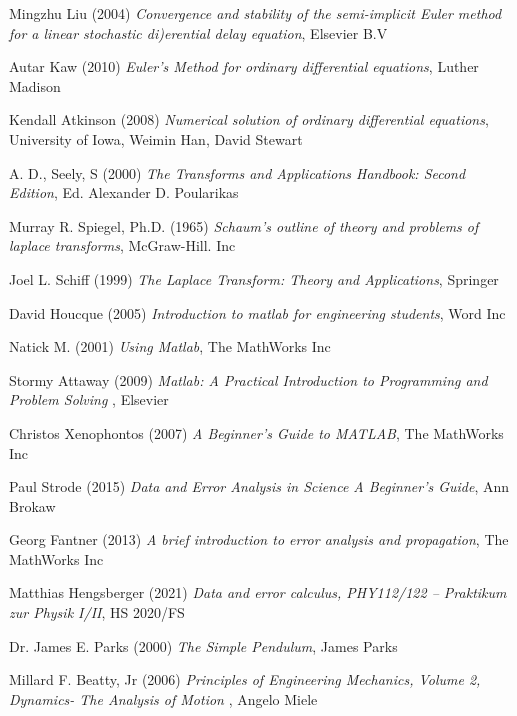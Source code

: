 \documentclass[12pt, a4paper]{article}
\begin{document}
\begin{thebibliography}{15}
Mingzhu Liu (2004) \emph{Convergence and stability of the semi-implicit Euler method
for a linear stochastic di)erential delay equation}, Elsevier B.V

Autar Kaw (2010) \emph{Euler’s Method for ordinary differential equations}, Luther Madison

Kendall Atkinson (2008) \emph{Numerical solution of ordinary differential equations}, University of Iowa, Weimin Han, David Stewart

A. D., Seely, S (2000) \emph{The Transforms and Applications Handbook: Second Edition}, Ed. Alexander D. Poularikas

Murray R. Spiegel, Ph.D. (1965) \emph{Schaum's outline of theory and problems of laplace transforms}, McGraw-Hill. Inc

Joel L. Schiff (1999) \emph{The Laplace Transform: Theory and Applications}, Springer

David Houcque (2005) \emph{Introduction to matlab for engineering students}, Word Inc 

Natick M. (2001) \emph{Using Matlab}, The MathWorks Inc

Stormy Attaway (2009) \emph{Matlab: A Practical Introduction to Programming and Problem Solving
}, Elsevier

Christos Xenophontos (2007) \emph{A Beginner’s Guide to MATLAB}, The MathWorks Inc

Paul Strode (2015) \emph{Data and Error Analysis in Science A Beginner’s Guide}, Ann Brokaw

Georg Fantner (2013) \emph{A brief introduction to error analysis and propagation}, The MathWorks Inc

Matthias Hengsberger (2021) \emph{Data and error calculus, PHY112/122 – Praktikum zur Physik I/II}, HS 2020/FS

Dr. James E. Parks (2000) \emph{The Simple Pendulum}, James Parks

Millard F. Beatty, Jr (2006) \emph{Principles of Engineering Mechanics, Volume 2, Dynamics- The Analysis of Motion
}, Angelo Miele
\end{thebibliography}
\end{document}
